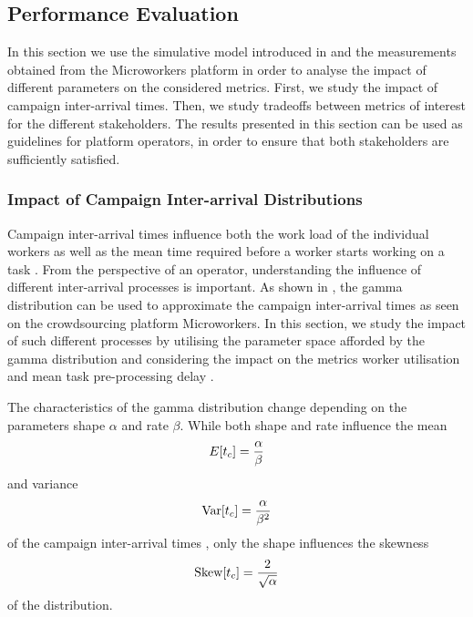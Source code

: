 \subsection{Performance Evaluation}\label{sec:cloud:crowdsourcing:performance_evaluation}

In this section we use the simulative model introduced in  and the measurements obtained from the Microworkers platform in order to analyse the impact of different parameters on the considered metrics.
First, we study the impact of campaign inter-arrival times.
Then, we study tradeoffs between metrics of interest for the different stakeholders.
The results presented in this section can be used as guidelines for platform operators, in order to ensure that both stakeholders are sufficiently satisfied.

\subsubsection*{Impact of Campaign Inter-arrival Distributions}

Campaign inter-arrival times \campaignIAT influence both the work load of the individual workers \workerUtilization as well as the mean time required before a worker starts working on a task \preTaskProcessingDelay.
From the perspective of an operator, understanding the influence of different inter-arrival processes is important.
As shown in , the gamma distribution can be used to approximate the campaign inter-arrival times \campaignIAT as seen on the crowdsourcing platform Microworkers.
In this section, we study the impact of such different processes by utilising the parameter space afforded by the gamma distribution and considering the impact on the metrics worker utilisation \workerUtilization and mean task pre-processing delay \preTaskProcessingDelay.

The characteristics of the gamma distribution change depending on the parameters shape \(\alpha\) and rate \(\beta\).
While both shape and rate influence the mean 
\begin{equation*}
E[t_c] =  \frac{\alpha}{\beta}
\end{equation*}
and variance 
\begin{equation*}
\operatorname{Var}[t_c] =  \frac{\alpha}{\beta^2}
\end{equation*}
of the campaign inter-arrival times \campaignIAT, only the shape influences the skewness 
\begin{equation*}
\operatorname{Skew}[t_c] =  \frac{2}{\sqrt{\alpha}}
\end{equation*}
of the distribution. 

